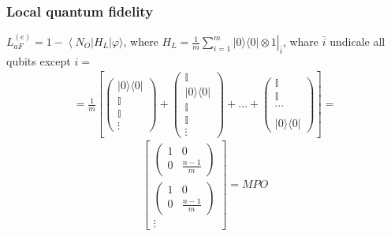 \subsubsection{Local quantum fidelity}
$L_{a F}^{(e)}=1-\left\langle N_O\right| H_L|\varphi\rangle$, where $H_L=\left.\frac{1}{m} \sum_{i=1}^m|0\rangle\langle 0| \otimes 1\right|_{\bar{i}}$, whare $\bar{i}$ undicale all qubits except $i=$
$$
\begin{aligned}
=\frac{1}{m}\left[\left(\begin{array}{c}
|0\rangle\langle 0| \\
\mathbb{I}  \\
\mathbb{I}  \\
\vdots
\end{array}\right)+\left(\begin{array}{c}
\mathbb{I} \\
|0\rangle\langle 0| \\
\mathbb{I}  \\
\mathbb{I}  \\
\vdots
\end{array}\right)+\ldots+\left(\begin{array}{c}
\mathbb{I} \\
\mathbb{I} \\
\cdots \\
\\
|0\rangle\langle 0|
\end{array}\right)\right]=
\end{aligned}
$$
\[
\left[
\begin{array}{c}
\left(\begin{array}{cc}
1 & 0 \\
0 & \frac{n-1}{m}
\end{array}\right) \\[10pt]
\left(\begin{array}{cc}
1 & 0 \\
0 & \frac{n-1}{m}
\end{array}\right) \\[10pt]
\vdots
\end{array}
\right] = MPO
\]


